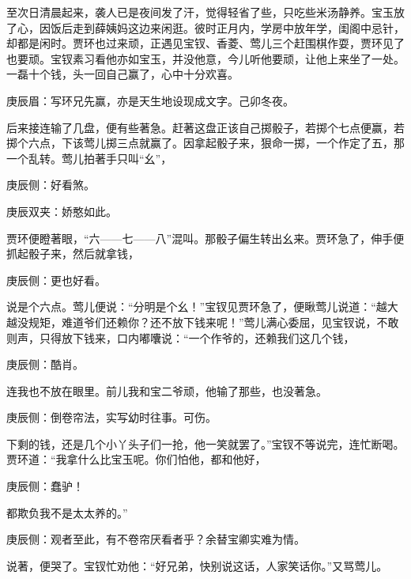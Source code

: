 \begin{parag}
    至次日清晨起来，袭人已是夜间发了汗，觉得轻省了些，只吃些米汤静养。宝玉放了心，因饭后走到薛姨妈这边来闲逛。彼时正月内，学房中放年学，闺阁中忌针，却都是闲时。贾环也过来顽，正遇见宝钗、香菱、莺儿三个赶围棋作耍，贾环见了也要顽。宝钗素习看他亦如宝玉，并没他意，今儿听他要顽，让他上来坐了一处。一磊十个钱，头一回自己赢了，心中十分欢喜。\begin{note}庚辰眉：写环兄先赢，亦是天生地设现成文字。己卯冬夜。\end{note}后来接连输了几盘，便有些著急。赶著这盘正该自己掷骰子，若掷个七点便赢，若掷个六点，下该莺儿掷三点就赢了。因拿起骰子来，狠命一掷，一个作定了五，那一个乱转。莺儿拍著手只叫“幺”，\begin{note}庚辰侧：好看煞。\end{note}\begin{note}庚辰双夹：娇憨如此。\end{note}贾环便瞪著眼，“六——七——八”混叫。那骰子偏生转出幺来。贾环急了，伸手便抓起骰子来，然后就拿钱，\begin{note}庚辰侧：更也好看。\end{note}说是个六点。莺儿便说：“分明是个幺！”宝钗见贾环急了，便瞅莺儿说道：“越大越没规矩，难道爷们还赖你？还不放下钱来呢！”莺儿满心委屈，见宝钗说，不敢则声，只得放下钱来，口内嘟囔说：“一个作爷的，还赖我们这几个钱，\begin{note}庚辰侧：酷肖。\end{note}连我也不放在眼里。前儿我和宝二爷顽，他输了那些，也没著急。\begin{note}庚辰侧：倒卷帘法，实写幼时往事。可伤。\end{note}下剩的钱，还是几个小丫头子们一抢，他一笑就罢了。”宝钗不等说完，连忙断喝。贾环道：“我拿什么比宝玉呢。你们怕他，都和他好，\begin{note}庚辰侧：蠢驴！\end{note}都欺负我不是太太养的。”\begin{note}庚辰侧：观者至此，有不卷帘厌看者乎？余替宝卿实难为情。\end{note}说著，便哭了。宝钗忙劝他：“好兄弟，快别说这话，人家笑话你。”又骂莺儿。
\end{parag}



